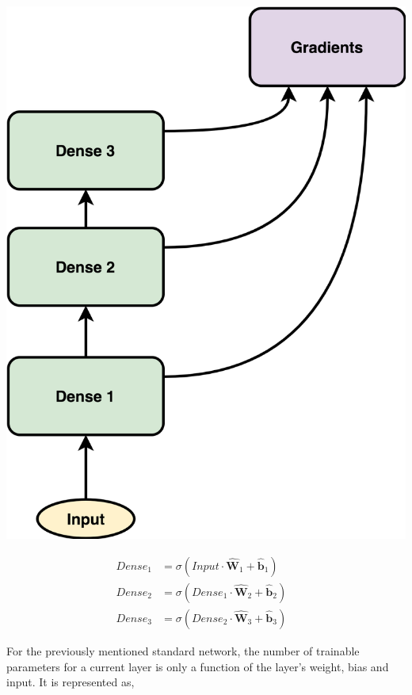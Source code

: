 \documentclass{article}
\let\oldhat\hat
\renewcommand{\hat}[1]{\oldhat{\mathbf{#1}}}
\begin{document}
\noindent\begin{minipage}{.45\textwidth}
   \centering
   \includegraphics[scale=0.09]{SimpleFFN.png}
   \label{fig:SimpleFFN.png}
\end{minipage}
\begin{minipage}{.45\textwidth}
\begin{equation}
\label{eq:ffn_math_representation}
\begin{aligned}
   Dense_{1} &= \sigma(Input \cdot \hat{W}_{1} + \hat{b}_{1}) &\\
   Dense_{2} &= \sigma(Dense_{1} \cdot \hat{W}_{2} + \hat{b}_{2}) &\\
   Dense_{3} &= \sigma(Dense_{2} \cdot \hat{W}_{3} + \hat{b}_{3}) 
\end{aligned}
\end{equation}
\end{minipage}

For the previously mentioned standard network, the number of trainable parameters for a current layer is only a function of the layer's weight, bias and input. It is represented as, 
\end{document}
